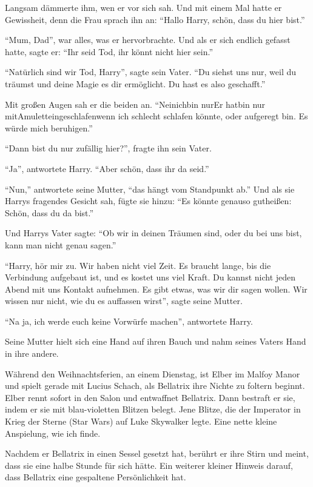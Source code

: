 \begin{traum}
Langsam dämmerte ihm, wen er vor sich sah. Und mit einem Mal hatte er Gewissheit, denn die Frau sprach ihn an: \enquote{Hallo Harry, schön, dass du hier bist.}

\enquote{Mum, Dad}, war alles, was er hervorbrachte. Und als er sich endlich gefasst hatte, sagte er: \enquote{Ihr seid Tod, ihr könnt nicht hier sein.}

\enquote{Natürlich sind wir Tod, Harry}, sagte sein Vater. \enquote{Du siehst uns nur, weil du träumst und deine Magie es dir ermöglicht. Du hast es also geschafft.}

Mit großen Augen sah er die beiden an. \enquote{Nein\abs ich\abs bin nur\abs Er hat\abs bin nur mit\abs Amulett\abs eingeschlafen\abs wenn ich schlecht schlafen könnte, oder aufgeregt bin. Es würde mich beruhigen.}

\enquote{Dann bist du nur zufällig hier?}, fragte ihn sein Vater.

\enquote{Ja}, antwortete Harry. \enquote{Aber schön, dass ihr da seid.}

\enquote{Nun,} antwortete seine Mutter, \enquote{das hängt vom Standpunkt ab.} Und als sie Harrys fragendes Gesicht sah, fügte sie hinzu: \enquote{Es könnte genauso gutheißen: Schön, dass du da bist.}

Und Harrys Vater sagte: \enquote{Ob wir in deinen Träumen sind, oder du bei uns bist, kann man nicht genau sagen.}

\enquote{Harry, hör mir zu. Wir haben nicht viel Zeit. Es braucht lange, bis die Verbindung aufgebaut ist, und es kostet uns viel Kraft. Du kannst nicht jeden Abend mit uns Kontakt aufnehmen. Es gibt etwas, was wir dir sagen wollen. Wir wissen nur nicht, wie du es auffassen wirst}, sagte seine Mutter.

\enquote{Na ja, ich werde euch keine Vorwürfe machen}, antwortete Harry.

Seine Mutter hielt sich eine Hand auf ihren Bauch und nahm seines Vaters Hand in ihre andere.
\end{traum}



\begin{kommentar}
Während den Weihnachtsferien, an einem Dienstag, ist Elber im Malfoy Manor und spielt gerade mit Lucius Schach, als Bellatrix ihre Nichte zu foltern beginnt. Elber rennt sofort in den Salon und entwaffnet Bellatrix. Dann bestraft er sie, indem er sie mit blau-violetten Blitzen belegt. Jene Blitze, die der Imperator in Krieg der Sterne (Star Wars) auf Luke Skywalker legte. Eine nette kleine Anspielung, wie ich finde.
\end{kommentar}

\begin{kommentar}
Nachdem er Bellatrix in einen Sessel gesetzt hat, berührt er ihre Stirn und meint, dass sie eine halbe Stunde für sich hätte. Ein weiterer kleiner Hinweis darauf, dass Bellatrix eine gespaltene Persönlichkeit hat.
\end{kommentar}
